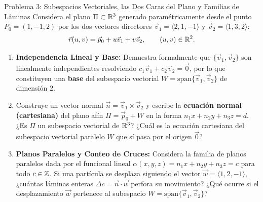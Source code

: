 \documentclass[11pt,letterpaper]{article}
\begin{document}

\begin{infobox}{Problema 3: Subespacios Vectoriales, las Dos Caras del Plano y Familias de Láminas}
Considera el plano $\Pi \subset \mathbb{R}^3$ generado paramétricamente desde el punto $P_0 = (1, -1, 2)$ por los dos vectores directores $\vec{v}_1 = \langle 2, 1, -1 \rangle$ y $\vec{v}_2 = \langle 1, 3, 2 \rangle$:
\[
    \vec{r}(u,v) = \vec{p}_0 + u\vec{v}_1 + v\vec{v}_2, \qquad (u,v) \in \mathbb{R}^2.
\]
\begin{enumerate}[label=(\alph*)]
    \item \textbf{Independencia Lineal y Base:} Demuestra formalmente que $\{\vec{v}_1, \vec{v}_2\}$ son linealmente independientes resolviendo $c_1\vec{v}_1 + c_2\vec{v}_2 = \vec{0}$, por lo que constituyen una \textbf{base} del subespacio vectorial $W = \text{span}\{\vec{v}_1, \vec{v}_2\}$ de dimensión $2$.
    \item Construye un vector normal $\vec{n} = \vec{v}_1 \times \vec{v}_2$ y escribe la \textbf{ecuación normal (cartesiana)} del plano afín $\Pi = \vec{p}_0 + W$ en la forma $n_1 x + n_2 y + n_3 z = d$. ¿Es $\Pi$ un subespacio vectorial de $\mathbb{R}^3$? ¿Cuál es la ecuación cartesiana del subespacio vectorial paralelo $W$ que sí pasa por el origen $\vec{0}$?
    \item \textbf{Planos Paralelos y Conteo de Cruces:} Considera la familia de planos paralelos dada por el funcional lineal $\alpha(x,y,z) = n_1 x + n_2 y + n_3 z = c$ para todo $c \in \mathbb{Z}$. Si una partícula se desplaza siguiendo el vector $\vec{w} = \langle 1, 2, -1 \rangle$, ¿cuántas láminas enteras $\Delta c = \vec{n}\cdot\vec{w}$ perfora su movimiento? ¿Qué ocurre si el desplazamiento $\vec{w}$ pertenece al subespacio $W = \text{span}\{\vec{v}_1, \vec{v}_2\}$?
\end{enumerate}
\end{infobox}
\end{document}
